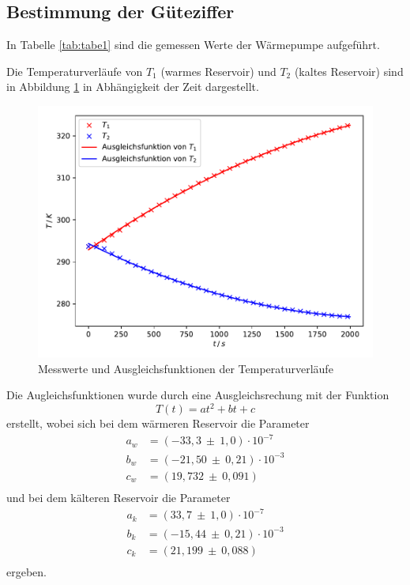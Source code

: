 \subsection{Bestimmung der Güteziffer}
In Tabelle \ref{tab:tabe1} sind die gemessen Werte der Wärmepumpe aufgeführt.

\noindent Die Temperaturverläufe von $ T_1 $ (warmes Reservoir) und $ T_2 $ (kaltes
Reservoir) sind in Abbildung \ref{fig:plot1} in Abhängigkeit der Zeit dargestellt.
\begin{figure}[H]
  \centering
  \includegraphics{plot1.pdf}
  \caption{Messwerte und Ausgleichsfunktionen der Temperaturverläufe}
  \label{fig:plot1}
\end{figure}
Die Augleichsfunktionen wurde durch eine Ausgleichsrechung mit der Funktion
\begin{equation}
  T(t) = at^2 +bt +c
\end{equation}
erstellt, wobei sich bei dem wärmeren Reservoir die Parameter
\begin{align*}
  a_w &= (-33,3 \: \pm \: 1,0) \cdot 10^{-7} \\
  b_w &= (-21,50 \: \pm \: 0,21) \cdot 10^{-3} \\
  c_w &= (19,732 \: \pm \: 0,091) \\
\end{align*}
und bei dem kälteren Reservoir die Parameter
\begin{align*}
  a_k &= (33,7 \: \pm \: 1,0) \cdot 10^{-7} \\
  b_k &= (-15,44 \: \pm \: 0,21) \cdot 10^{-3} \\
  c_k &= (21,199 \: \pm \: 0,088) \\
\end{align*}
ergeben.

